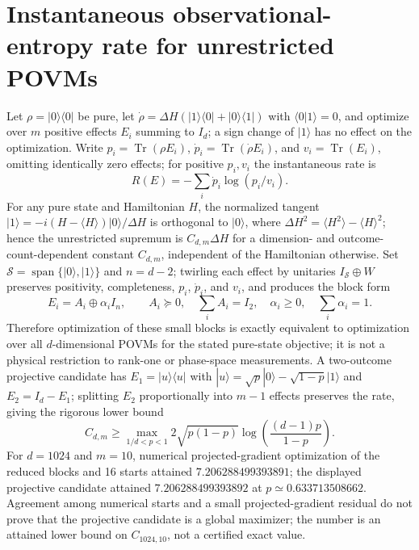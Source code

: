 \documentclass[11pt,a4paper]{article}
\DeclareMathOperator{\Tr}{Tr}
\begin{document}
\section*{Instantaneous observational-entropy rate for unrestricted POVMs}
Let $\rho=|0\rangle\langle0|$ be pure, let $\dot\rho=\Delta H(|1\rangle\langle0|+|0\rangle\langle1|)$ with $\langle0|1\rangle=0$, and optimize over $m$ positive effects $E_i$ summing to $I_d$; a sign change of $|1\rangle$ has no effect on the optimization.
Write $p_i=\Tr(\rho E_i)$, $\dot p_i=\Tr(\dot\rho E_i)$, and $v_i=\Tr(E_i)$, omitting identically zero effects; for positive $p_i,v_i$ the instantaneous rate is
\[R(E)=-\sum_i\dot p_i\log(p_i/v_i).\]
For any pure state and Hamiltonian $H$, the normalized tangent $|1\rangle=-i(H-\langle H\rangle)|0\rangle/\Delta H$ is orthogonal to $|0\rangle$, where $\Delta H^2=\langle H^2\rangle-\langle H\rangle^2$; hence the unrestricted supremum is $C_{d,m}\Delta H$ for a dimension- and outcome-count-dependent constant $C_{d,m}$, independent of the Hamiltonian otherwise.
Set $\mathcal S=\operatorname{span}\{|0\rangle,|1\rangle\}$ and $n=d-2$; twirling each effect by unitaries $I_{\mathcal S}\oplus W$ preserves positivity, completeness, $p_i$, $\dot p_i$, and $v_i$, and produces the block form
\[E_i=A_i\oplus\alpha_iI_n,\qquad A_i\succeq0,\quad\sum_iA_i=I_2,\quad\alpha_i\geq0,\quad\sum_i\alpha_i=1.\]
Therefore optimization of these small blocks is exactly equivalent to optimization over all $d$-dimensional POVMs for the stated pure-state objective; it is not a physical restriction to rank-one or phase-space measurements.
A two-outcome projective candidate has $E_1=|u\rangle\langle u|$ with $|u\rangle=\sqrt p|0\rangle-\sqrt{1-p}|1\rangle$ and $E_2=I_d-E_1$; splitting $E_2$ proportionally into $m-1$ effects preserves the rate, giving the rigorous lower bound
\[C_{d,m}\geq\max_{1/d<p<1}2\sqrt{p(1-p)}\log\!\left(\frac{(d-1)p}{1-p}\right).\]
For $d=1024$ and $m=10$, numerical projected-gradient optimization of the reduced blocks and 16 starts attained $7.206288499393891$; the displayed projective candidate attained $7.206288499393892$ at $p\simeq0.633713508662$.
Agreement among numerical starts and a small projected-gradient residual do not prove that the projective candidate is a global maximizer; the number is an attained lower bound on $C_{1024,10}$, not a certified exact value.
\end{document}
